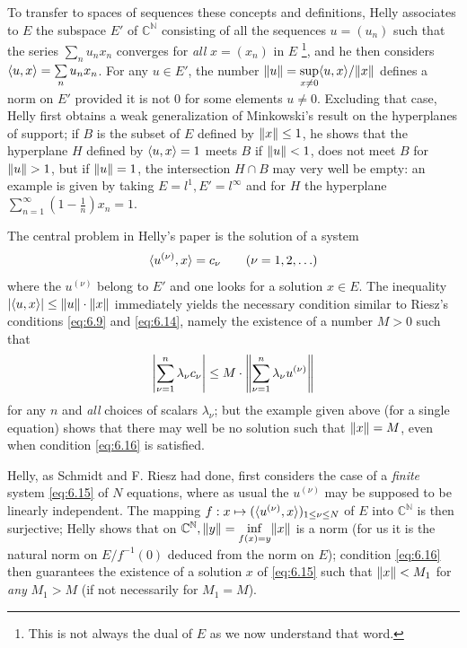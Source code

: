 \documentclass[12pt,a4paper,leqno,twoside]{extbook}
\DeclarePairedDelimiter{\norm}{\lVert}{\rVert}
\DeclarePairedDelimiter{\ip}{\langle}{\rangle}
\newcommand{\C}{\mathbb{C}}
\newcommand{\N}{\mathbb{N}}
\begin{document}
To transfer to spaces of sequences these concepts and definitions, Helly associates to \(E\) the subspace \(E'\) of \(\C^{\N}\) consisting of all the sequences \(u = (u_n)\) such that the series \(\sum\limits_n u_n x_n\) converges for \emph{all} \(x = (x_n)\) in \(E\) \footnote{This is not always the dual of \(E\) as we now understand that word.}, and he then considers \(\ip{u,x} = \sum\limits_n u_n x_n\). For any \(u \in E'\), the number \(\norm{u} = \sup\limits_{x \neq 0}\ip{u,x}/\norm{x}\) defines a norm on \(E'\) provided it is not 0 for some elements \(u \neq 0\). Excluding that case, Helly first obtains a weak generalization of Minkowski's result on the hyperplanes of support; if \(B\) is the subset of \(E\) defined by \(\norm{x} \leq 1\), he shows that the hyperplane \(H\) defined by \(\ip{u,x} = 1\) meets \(B\) if \(\norm{u} < 1\), does not meet \(B\) for \(\norm{u} > 1\), but if \(\norm{u} = 1\), the intersection \(H \cap B\) may very well be empty: an example is given by taking \(E = l^1, E' = l^\infty\) and for \(H\) the hyperplane \(\sum\limits_{n=1}^\infty \left(1 - \frac{1}{n}\right) x_n = 1\).

The central problem in Helly's paper is the solution of a system
\begin{equation}
    \label{eq:6.15}
    \ip{u^{(\nu)}, x} = c_\nu \qquad (\nu=1,2,\ldots)
\end{equation}
where the \(u^{(\nu)}\) belong to \(E'\) and one looks for a solution \(x \in E\). The inequality \(|\ip{u,x}| \leq \norm{u} \cdot \norm{x}\) immediately yields the necessary condition similar to Riesz's conditions \eqref{eq:6.9} and \eqref{eq:6.14}, namely the existence of a number \(M > 0\) such that
\begin{equation}
    \label{eq:6.16}
    \left| \sum_{\nu=1}^n \lambda_\nu c_\nu \right| \leq M \cdot \norm*{\sum_{\nu=1}^n \lambda_\nu u^{(\nu)}}
\end{equation}
for any \(n\) and \emph{all} choices of scalars \(\lambda_\nu\); but the example given above (for a single equation) shows that there may well be no solution such that \(\norm{x} = M\), even when condition \eqref{eq:6.16} is satisfied.

Helly, as Schmidt and F. Riesz had done, first considers the case of a \emph{finite} system \eqref{eq:6.15} of \(N\) equations, where as usual the \(u^{(\nu)}\) may be supposed to be linearly independent. The mapping \(f: x \mapsto (\ip{u^{(\nu)},x})_{1 \leq \nu \leq N}\) of \(E\) into \(\C^{\N}\) is then surjective; Helly shows that on \(\C^{\N}, \norm{y} = \inf\limits_{f(x)=y} \norm{x}\) is a norm (for us it is the natural norm on \(E/f^{-1}(0)\) deduced from the norm on \(E\)); condition \eqref{eq:6.16} then guarantees the existence of a solution \(x\) of \eqref{eq:6.15} such that \(\norm{x} < M_1\) for \emph{any} \(M_1 > M\) (if not necessarily for \(M_1 = M\)).
\end{document}
